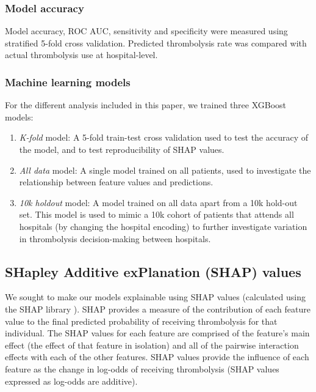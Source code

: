 
\subsubsection{Model accuracy}

Model accuracy, ROC AUC, sensitivity and specificity were measured using stratified 5-fold cross validation. Predicted thrombolysis rate was compared with actual thrombolysis use at hospital-level.


\subsubsection{Machine learning models}

For the different analysis included in this paper, we trained three XGBoost models:
\begin{enumerate}
    \item \emph{K-fold} model: A 5-fold train-test cross validation used to test the accuracy of the model, and to test reproducibility of SHAP values.
       
    \item \emph{All data} model: A single model trained on all patients, used to investigate the relationship between feature values and predictions.
    
    \item \emph{10k holdout} model: A model trained on all data apart from a 10k hold-out set. This model is used to mimic a 10k cohort of patients that attends all hospitals (by changing the hospital encoding) to further investigate variation in thrombolysis decision-making between hospitals.
\end{enumerate}

\subsection{SHapley Additive exPlanation (SHAP) values}

We sought to make our models explainable using SHAP values (calculated using the SHAP library \cite{lundberg_unified_2017}). SHAP provides a measure of the contribution of each feature value to the final predicted probability of receiving thrombolysis for that individual. The SHAP values for each feature are comprised of the feature’s main effect (the effect of that feature in isolation) and all of the pairwise interaction effects with each of the other features. SHAP values provide the influence of each feature as the change in log-odds of receiving thrombolysis (SHAP values expressed as log-odds are additive).

